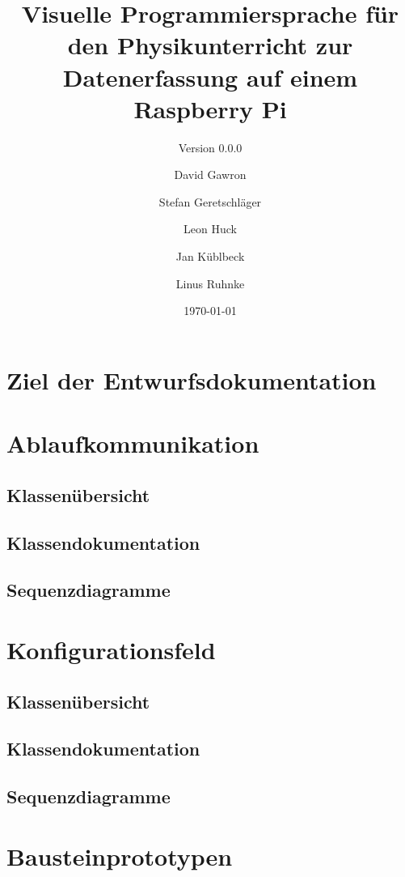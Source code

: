 \documentclass[parskip=full]{scrartcl}
\title{Visuelle Programmiersprache für den Physikunterricht zur Datenerfassung auf einem Raspberry Pi}
\subtitle{Version 0.0.0}
\author{David Gawron \and Stefan Geretschläger \and Leon Huck \and Jan Küblbeck \and Linus Ruhnke}
\date{\today}
\begin{document}
\maketitle

\clearpage
\tableofcontents 					%

\clearpage
\section{Ziel der Entwurfsdokumentation}

\clearpage
\section{Ablaufkommunikation}

\subsection{Klassenübersicht}

\subsection{Klassendokumentation}

\subsection{Sequenzdiagramme}

\clearpage
\section{Konfigurationsfeld}

\subsection{Klassenübersicht}

\subsection{Klassendokumentation}

\subsection{Sequenzdiagramme}

\clearpage
\section{Bausteinprototypen}
\end{document}
